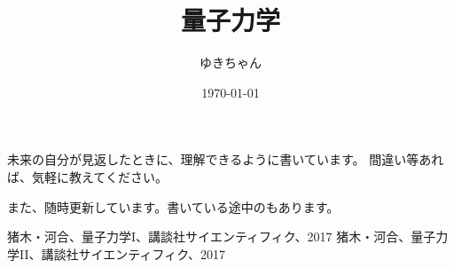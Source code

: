 \documentclass[dvipdfmx,a4paper,16pt]{jsarticle}
\title{量子力学}
\author{ゆきちゃん}
\date{\today}
\makeatletter
\def\section{\newpage\@startsection {section}{1}{\z@}{-3.5ex plus -1ex minus -.2ex}{2.3 ex plus .2ex}{\Large\bf}}
\makeatother
\begin{document}
\maketitle

未来の自分が見返したときに、理解できるように書いています。
間違い等あれば、気軽に教えてください。

また、随時更新しています。書いている途中のもあります。

\tableofcontents

\newpage

% 

% 

\begin{thebibliography}{99}
	\bibitem{} 猪木・河合、量子力学I、講談社サイエンティフィク、2017
	\bibitem{} 猪木・河合、量子力学II、講談社サイエンティフィク、2017
\end{thebibliography}















\end{document}
